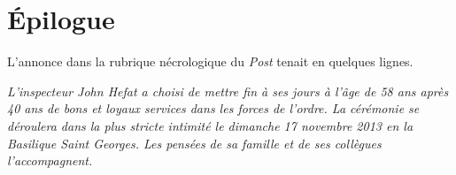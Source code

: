 \chapter*{Épilogue}

L'annonce dans la rubrique nécrologique du \emph{Post} tenait en quelques lignes.

\emph{L'inspecteur John Hefat a choisi de mettre fin à ses jours à l'âge de 58 ans après 40 ans de bons et loyaux 
services dans les forces de l'ordre. La cérémonie se déroulera dans la plus stricte intimité le dimanche 17 novembre 
2013 en la Basilique Saint Georges. Les pensées de sa famille et de ses collègues l'accompagnent.}
